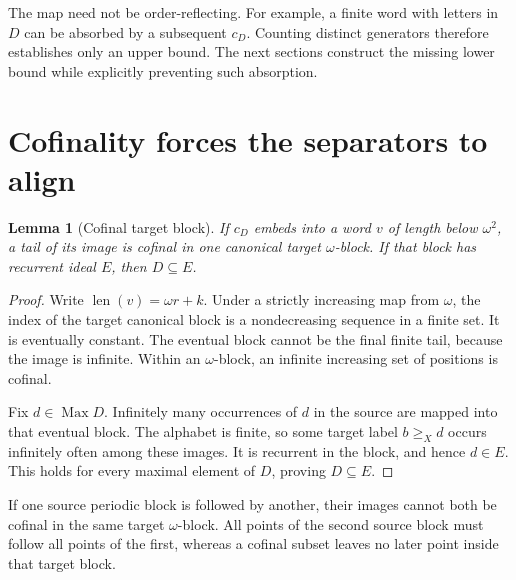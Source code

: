 \documentclass[11pt]{article}
\numberwithin{equation}{section}
\theoremstyle{plain}
\newtheorem{lemma}[lemma]{Lemma}
\theoremstyle{definition}
\theoremstyle{remark}
\newcommand{\len}{\operatorname{len}}
\newcommand{\Max}{\operatorname{Max}}
\begin{document}
The map need not be order-reflecting. For example, a finite word with letters in $D$ can be absorbed by a subsequent $c_D$. Counting distinct generators therefore establishes only an upper bound. The next sections construct the missing lower bound while explicitly preventing such absorption.

\section{Cofinality forces the separators to align}\label{sec:cofinal}

\begin{lemma}[Cofinal target block]\label{lem:cofinal}
If $c_D$ embeds into a word $v$ of length below $\omega^2$, a tail of its image is cofinal in one canonical target $\omega$-block. If that block has recurrent ideal $E$, then $D\subseteq E$.
\end{lemma}
\begin{proof}
Write $\len(v)=\omega r+k$. Under a strictly increasing map from $\omega$, the index of the target canonical block is a nondecreasing sequence in a finite set. It is eventually constant. The eventual block cannot be the final finite tail, because the image is infinite. Within an $\omega$-block, an infinite increasing set of positions is cofinal.

Fix $d\in\Max D$. Infinitely many occurrences of $d$ in the source are mapped into that eventual block. The alphabet is finite, so some target label $b\geq_X d$ occurs infinitely often among these images. It is recurrent in the block, and hence $d\in E$. This holds for every maximal element of $D$, proving $D\subseteq E$.
\end{proof}

If one source periodic block is followed by another, their images cannot both be cofinal in the same target $\omega$-block. All points of the second source block must follow all points of the first, whereas a cofinal subset leaves no later point inside that target block.
\end{document}
